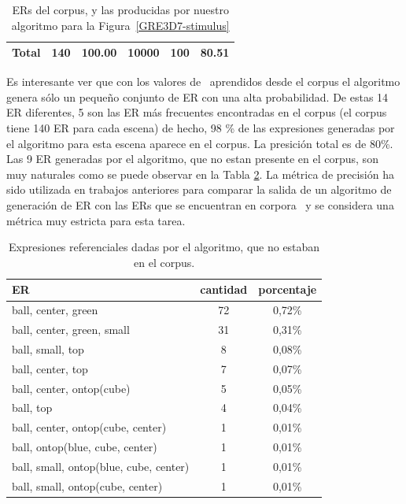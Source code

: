 \begin{table}[H]
\begin{small}
\begin{center}
\begin{tabular}{|l|r|r|r|r|r|}
\hline
Total & 140 & 100.00 & 10000 & 100 & 80.51 \\
\hline
\end{tabular}
\caption{ERs del corpus, y las producidas por nuestro algoritmo para la Figura~\ref{GRE3D7-stimulus}\label{results-algo-fig3}}
\vspace*{-.5cm}
\end{center}
\end{small}
\end{table}


Es interesante ver que con los valores de \puse\ aprendidos desde el corpus el algoritmo genera s\'olo un peque\~no conjunto de ER con una alta probabilidad. De estas 14 ER diferentes, 5 son las ER m\'as frecuentes encontradas en el corpus (el corpus tiene 140 ER para cada escena) de hecho, 98 \% de las expresiones generadas por el algoritmo para esta escena aparece en el corpus. La presici\'on total es de 80\%. Las 9 ER generadas por el algoritmo, que no estan presente en el corpus, son muy naturales como se puede observar en la Tabla \ref{results-algo-fig3}. La m\'etrica de precisi\'on ha sido utilizada en trabajos anteriores para comparar la salida de un algoritmo de generaci\'on de ER con las ERs que se encuentran en corpora~\cite{sluis07:eval,viet:gene11} y se considera una m\'etrica muy estricta para esta tarea.

\begin{table}[h!]
\begin{small}
\begin{center}
\begin{tabular}{|l|c|c|}
\hline
ER & cantidad & porcentaje\\ \hline
ball, center, green	&	72 &0,72\% \\
ball, center, green, small	&	31 &0,31\% \\
ball, small, top &8 &0,08\% \\
ball, center, top	&	7 &0,07\% \\
ball, center, ontop(cube)&	5 &0,05\% \\
ball, top & 4 &0,04\% \\
ball, center, ontop(cube, center)	&	1&0,01\% \\
ball, ontop(blue, cube, center)	&	1&0,01\% \\
ball, small, ontop(blue, cube, center)	&	1&0,01\% \\
ball, small, ontop(cube, center)	&	1&0,01\% \\
\hline
\end{tabular}
\caption{Expresiones referenciales dadas por el algoritmo, que no estaban en el corpus.}\label{results-algo-fig3}
\end{center}
\end{small}
\end{table}


